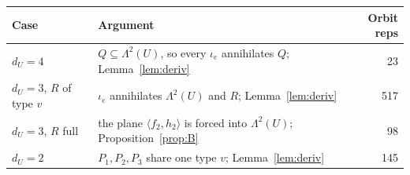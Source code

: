 \documentclass[11pt,a4paper]{article}
\theoremstyle{plain}
\theoremstyle{definition}
\theoremstyle{remark}
\newcommand{\Lam}{\Lambda^{2}}
\newcommand{\dU}{d_U}
\begin{document}
\begin{center}
\begin{tabularx}{0.92\textwidth}{@{}l X r@{}}
\toprule
Case & Argument & Orbit reps \\
\midrule
$\dU=4$ & $Q\subseteq\Lam(U)$, so every $\iota_e$ annihilates $Q$; Lemma~\ref{lem:deriv} & 23\\
$\dU=3$, $R$ of type $v$ & $\iota_e$ annihilates $\Lam(U)$ and $R$; Lemma~\ref{lem:deriv} & 517\\
$\dU=3$, $R$ full & the plane $\langle f_2,h_2\rangle$ is forced into $\Lam(U)$; Proposition~\ref{prop:B} & 98\\
$\dU=2$ & $P_1,P_2,P_3$ share one type $v$; Lemma~\ref{lem:deriv} & 145\\
\bottomrule
\end{tabularx}
\end{center}
\end{document}
